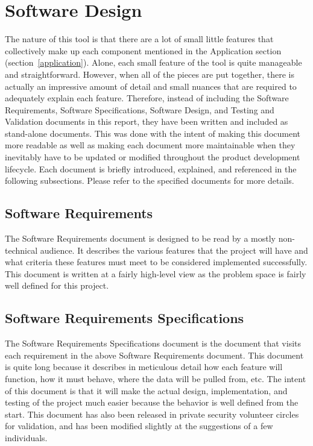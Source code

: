\documentclass[letterpaper,12pt]{article}
\begin{document}
\section{Software Design} \label{design}
The nature of this tool is that there are a lot of small little features that
collectively make up each component mentioned in the Application section
(section~\ref{application}).  Alone, each small feature of the tool is quite
manageable and straightforward.  However, when all of the pieces are put
together, there is actually an impressive amount of detail and small nuances
that are required to adequately explain each feature.  Therefore, instead of
including the Software Requirements, Software Specifications, Software Design,
and Testing and Validation documents in this report, they have been written and
included as stand-alone documents.  This was done with the intent of making this
document more readable as well as making each document more maintainable when
they inevitably have to be updated or modified throughout the product
development lifecycle.  Each document is briefly introduced, explained, and
referenced in the following subsections.  Please refer to the specified
documents for more details.

\subsection{Software Requirements}
\label{software_requirements}
The Software Requirements document \cite{Requirements} is designed to be read by
a mostly non-technical audience.  It describes the various features that the
project will have and what criteria these features must meet to be considered
implemented successfully.  This document is written at a fairly high-level view
as the problem space is fairly well defined for this project.

\subsection{Software Requirements Specifications}
\label{software_specifications}
The Software Requirements Specifications document \cite{Specification} is the
document that visits each requirement in the above Software Requirements
document.  This document is quite long because it describes in meticulous detail
how each feature will function, how it must behave, where the data will be
pulled from, etc.  The intent of this document is that it will make the actual
design, implementation, and testing of the project much easier because the
behavior is well defined from the start.  This document has also been released
in private security volunteer circles for validation, and has been modified
slightly at the suggestions of a few individuals.
\end{document}
